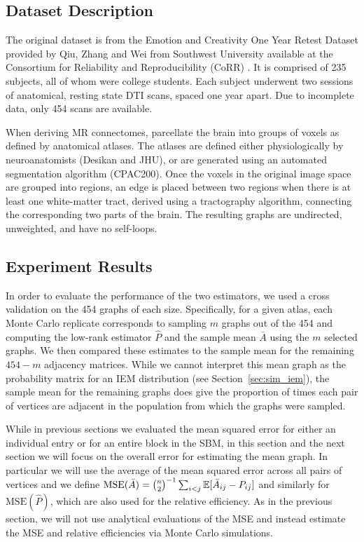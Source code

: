 \subsection{Dataset Description}
\label{section:data}

The original dataset is from the Emotion and Creativity One Year Retest Dataset provided by Qiu, Zhang and Wei from Southwest University available at the Consortium for Reliability and Reproducibility (CoRR) \citep{zuo2014open, gorgolewski2015high}. It is comprised of 235 subjects, all of whom were college students. Each subject underwent two sessions of anatomical, resting state DTI scans, spaced one year apart. Due to incomplete data, only 454 scans are available.

When deriving MR connectomes, \citet{kiar2016ndmg} parcellate the brain into groups of voxels as defined by anatomical atlases. The atlases are defined either physiologically by neuroanatomists (Desikan and JHU), or are generated using an automated segmentation algorithm (CPAC200).
Once the voxels in the original image space are grouped into regions, an edge is placed between two regions when there is at least one white-matter tract, derived using a tractography algorithm, connecting the corresponding two parts of the brain.
The resulting graphs are undirected, unweighted, and have no self-loops.




\subsection{Experiment Results}

In order to evaluate the performance of the two estimators, we used a cross validation on the 454 graphs of each size. 
Specifically, for a given atlas, each Monte Carlo replicate corresponds to sampling $m$ graphs out of the 454 and computing the low-rank estimator $\hat{P}$ and the sample mean $\bar{A}$ using the $m$ selected graphs.
We then compared these estimates to the sample mean for the remaining $454-m$ adjacency matrices.
While we cannot interpret this mean graph as the probability matrix for an IEM distribution (see Section~\ref{sec:sim_iem}), the sample mean for the remaining graphs does give the proportion of times each pair of vertices are adjacent in the population from which the graphs were sampled.

While in previous sections we evaluated the mean squared error for either an individual entry or for an entire block in the SBM, in this section and the next section we will focus on the overall error for estimating the mean graph.
In particular we will use the average of the mean squared error across all pairs of vertices and we define $\mathrm{MSE}(\bar{A}) = \binom{n}{2}^{-1} \sum_{i<j}\mathbb{E}[\bar{A}_{ij}-P_{ij}]$ and similarly for $\mathrm{MSE}(\hat{P})$, which are also used for the relative efficiency.
As in the previous section, we will not use analytical evaluations of the MSE and instead estimate the MSE and relative efficiencies via Monte Carlo simulations.

